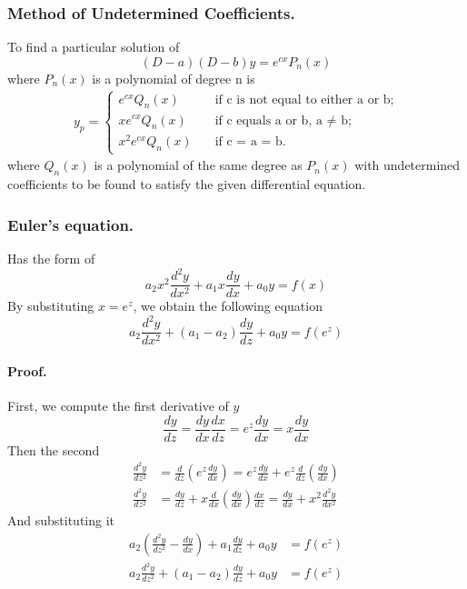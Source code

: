 \documentclass[../../../main.tex]{subfiles}
\begin{document}
\subsubsection{Method of Undetermined Coefficients.} To find a particular solution of
\begin{equation*}
    (D - a)(D - b)y=e^{cx}P_n(x)
\end{equation*}
where $P_n(x)$ is a polynomial of degree n is
\begin{align*}
    y_p=
    \begin{cases}
        e^{cx}Q_n(x) \quad    & \text{if c is not equal to either a or b;} \\
        xe^{cx}Q_n(x) \quad   & \text{if c equals a or b, a  $\neq$ b;}    \\
        x^2e^{cx}Q_n(x) \quad & \text{if c = a = b.}
    \end{cases}
\end{align*}
where $Q_n(x)$ is a polynomial of the same degree as $P_n(x)$ with undetermined
coefficients to be found to satisfy the given differential equation.

\subsubsection{Euler's equation.} Has the form of
\begin{equation*}
    a_2x^2\frac{d^2y}{dx^2} +a_1x\frac{dy}{dx} +a_0y=f(x)
\end{equation*}
By substituting $x=e^z$, we obtain the following equation
\begin{equation*}
    a_2\frac{d^2y}{dx^2} +(a_1-a_2)\frac{dy}{dz} +a_0y=f(e^z)
\end{equation*}

\paragraph*{Proof.} First, we compute the first derivative of $y$
\begin{equation*}
    \frac{dy}{dz}=\frac{dy}{dx}\frac{dx}{dz}=e^z\frac{dy}{dx}=x\frac{dy}{dx}
\end{equation*}
Then the second
\begin{align*}
    \frac{d^2y}{dz^2} & =\frac{d}{dz}\left(e^z\frac{dy}{dx}\right)=e^z\frac{dy}{dx} + e^z\frac{d}{dz}\left(\frac{dy}{dx}\right) \\
    \frac{d^2y}{dz^2} & =\frac{dy}{dz}+x\frac{d}{dx}\left(\frac{dy}{dx}\right)\frac{dx}{dz}=\frac{dy}{dx}+x^2\frac{d^2y}{dx^2}
\end{align*}
And substituting it
\begin{align*}
    a_2 \left(\frac{d^2y}{dz^2}-\frac{dy}{dx}\right)+ a_1\frac{dy}{dz} +a_0y & =f(e^z) \\
    a_2\frac{d^2y}{dz^2}+ (a_1-a_2)\frac{dy}{dz} +a_0y                       & =f(e^z)
\end{align*}
\end{document}
